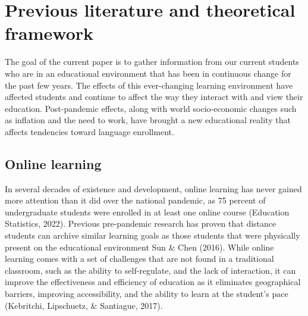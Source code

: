 \documentclass[
  man]{apa6}
\begin{document}
\newpage

\hypertarget{previous-literature-and-theoretical-framework}{%
\section{Previous literature and theoretical framework}\label{previous-literature-and-theoretical-framework}}

The goal of the current paper is to gather information from our current students who are in an educational environment that has been in continuous change for the past few years.
The effects of this ever-changing learning environment have affected students and continue to affect the way they interact with and view their education.
Post-pandemic effects, along with world socio-economic changes such as inflation and the need to work, have brought a new educational reality that affects tendencies toward language enrollment.

\hypertarget{online-learning}{%
\subsection{Online learning}\label{online-learning}}

In several decades of existence and development, online learning has never gained more attention than it did over the national pandemic, as 75 percent of undergraduate students were enrolled in at least one online course (Education Statistics, 2022).
Previous pre-pandemic research has proven that distance students can archive similar learning goals as those students that were physically present on the educational environment Sun \& Chen (2016).
While online learning comes with a set of challenges that are not found in a traditional classroom, such as the ability to self-regulate, and the lack of interaction, it can improve the effectiveness and efficiency of education as it eliminates geographical barriers, improving accessibility, and the ability to learn at the student's pace (Kebritchi, Lipschuetz, \& Santiague, 2017).
\end{document}
